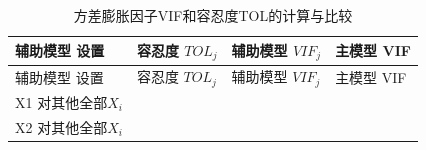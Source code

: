 \documentclass[12pt,(landscape,a4paper),(portrait,a4paper)]{article}
\begin{document}
\begin{longtable}[]{@{}llll@{}}
\caption{方差膨胀因子VIF和容忍度TOL的计算与比较}\tabularnewline
\toprule
\begin{minipage}[b]{0.52\columnwidth}\raggedright
辅助模型 设置\strut
\end{minipage} & \begin{minipage}[b]{0.11\columnwidth}\raggedright
容忍度 \(TOL_j\)\strut
\end{minipage} & \begin{minipage}[b]{0.11\columnwidth}\raggedright
辅助模型 \(VIF_j\)\strut
\end{minipage} & \begin{minipage}[b]{0.13\columnwidth}\raggedright
主模型 VIF\strut
\end{minipage}\tabularnewline
\midrule
\endfirsthead
\toprule
\begin{minipage}[b]{0.52\columnwidth}\raggedright
辅助模型 设置\strut
\end{minipage} & \begin{minipage}[b]{0.11\columnwidth}\raggedright
容忍度 \(TOL_j\)\strut
\end{minipage} & \begin{minipage}[b]{0.11\columnwidth}\raggedright
辅助模型 \(VIF_j\)\strut
\end{minipage} & \begin{minipage}[b]{0.13\columnwidth}\raggedright
主模型 VIF\strut
\end{minipage}\tabularnewline
\midrule
\endhead
\begin{minipage}[t]{0.52\columnwidth}\raggedright
X1 对其他全部\(X_i\)\strut
\end{minipage} & \begin{minipage}[t]{0.11\columnwidth}\raggedright
\strut
\end{minipage} & \begin{minipage}[t]{0.11\columnwidth}\raggedright
\strut
\end{minipage} & \begin{minipage}[t]{0.13\columnwidth}\raggedright
\strut
\end{minipage}\tabularnewline
\begin{minipage}[t]{0.52\columnwidth}\raggedright
X2 对其他全部\(X_i\)\strut
\end{minipage} & \begin{minipage}[t]{0.11\columnwidth}\raggedright
\strut
\end{minipage} & \begin{minipage}[t]{0.11\columnwidth}\raggedright

\end{minipage}
\end{longtable}
\end{document}
